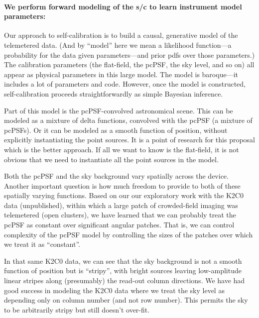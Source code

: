 \documentclass[12pt,preprint]{aastex}
\begin{document}
\paragraph{We perform forward modeling of the s/c to learn instrument model parameters:}

Our approach to self-calibration is to build a causal, generative model
of the telemetered data.
(And by ``model'' here we mean a likelihood function---a probability for
the data given parameters---and prior pdfs over those parameters.)
The calibration parameters (the flat-field, the pcPSF, the sky level,
and so on) all appear as physical parameters in this large model.
The model is baroque---it includes a lot of parameters and code.
However, once the model is constructed, self-calibration proceeds
straightforwardly as simple Bayesian inference.

Part of this model is the pcPSF-convolved astronomical scene.
This can be modeled as a mixture of delta functions, convolved with
the pcPSF (a mixture of pcPSFs).
Or it can be modeled as a smooth function of position, without
explicitly instantiating the point sources.
It is a point of research for this proposal which is the better
approach.
If all we want to know is the flat-field, it is not obvious that we
need to instantiate all the point sources in the model.

Both the pcPSF and the sky background vary spatially across the
device.
Another important question is how much freedom to provide to both
of these spatially varying functions.
Based on our our exploratory work with the K2C0 data (unpublished),
within which a large patch of crowded-field imaging was telemetered
(open clusters), we have learned that we can probably treat the pcPSF
as constant over significant angular patches.
That is, we can control complexity of the pcPSF model by controlling
the sizes of the patches over which we treat it as ``constant''.

In that same K2C0 data, we can see that the sky background is not a
smooth function of position but is ``stripy'', with bright sources
leaving low-amplitude linear stripes along (presumably) the read-out
column directions.
We have had good success in modeling the K2C0 data where we treat
the sky level as depending only on column number (and not row number).
This permits the sky to be arbitrarily stripy but still doesn't
over-fit.
\end{document}
